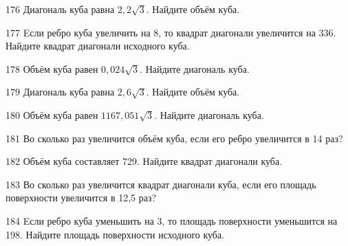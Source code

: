\begin{taskBN}{176}
Диагональ куба равна $2,2\sqrt{3}$. Найдите объём куба.
\end{taskBN}

\begin{taskBN}{177}
Eсли ребро куба увеличить на 8, то квадрат диагонали увеличится на 336. Найдите квадрат диагонали исходного куба.
\end{taskBN}

\begin{taskBN}{178}
Объём куба равен $0,024\sqrt{3}$. Найдите диагональ куба.
\end{taskBN}

\begin{taskBN}{179}
Диагональ куба равна $2,6\sqrt{3}$. Найдите объём куба.
\end{taskBN}

\begin{taskBN}{180}
Объём куба равен $1167,051\sqrt{3}$. Найдите диагональ куба.
\end{taskBN}

\begin{taskBN}{181}
Во сколько раз увеличится объём куба, если его ребро увеличится в 14 раз?
\end{taskBN}

\begin{taskBN}{182}
Объём куба составляет 729. Найдите квадрат диагонали куба.
\end{taskBN}

\begin{taskBN}{183}
Во сколько раз увеличится квадрат диагонали куба, если его площадь поверхности увеличится в 12,5 раз?
\end{taskBN}

\begin{taskBN}{184}
Eсли ребро куба уменьшить на 3, то площадь поверхности уменьшится на 198. Найдите площадь поверхности исходного куба.
\end{taskBN}

